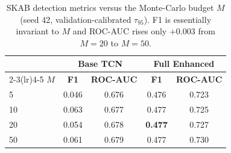 \begin{table}[H]
\centering
\caption{SKAB detection metrics versus the Monte-Carlo budget $M$ (seed 42, validation-calibrated $\tau_{95}$). F1 is essentially invariant to $M$ and ROC-AUC rises only $+0.003$ from $M=20$ to $M=50$.}
\label{table:skab_msensitivity}
\setlength{\tabcolsep}{6pt}\small
\begin{tabular}{lcccc}
\toprule
 & \multicolumn{2}{c}{\textbf{Base TCN}} & \multicolumn{2}{c}{\textbf{Full Enhanced}} \\
\cmidrule(lr){2-3}\cmidrule(lr){4-5}
\textbf{$M$} & \textbf{F1} & \textbf{ROC-AUC} & \textbf{F1} & \textbf{ROC-AUC} \\
\midrule
5  & 0.046 & 0.676 & 0.476 & 0.723 \\
10 & 0.063 & 0.677 & 0.477 & 0.725 \\
20 & 0.054 & 0.678 & \textbf{0.477} & 0.727 \\
50 & 0.061 & 0.679 & 0.477 & 0.730 \\
\bottomrule
\end{tabular}
\end{table}

